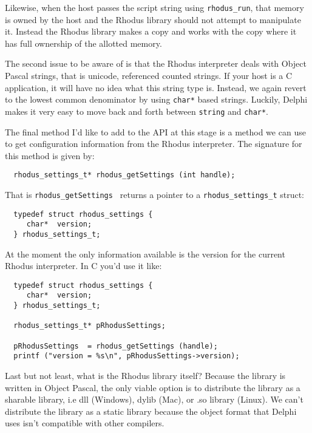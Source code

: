 Likewise, when the host passes the script string using {\tt rhodus_run}, that memory is owned by the host and the Rhodus library should not attempt to manipulate it. Instead the Rhodus library makes a copy and works with the copy where it has full ownership of the allotted memory.

The second issue to be aware of is that the Rhodus interpreter deals with Object Pascal strings, that is unicode, referenced counted strings. If your host is a C application, it will have no idea what this string type is. Instead, we again revert to the lowest common denominator by using {\tt char*} based strings. Luckily, Delphi makes it very easy to move back and forth between {\tt string} and {\tt char*}.

The final method I'd like to add to the API at this stage is a method we can use to get configuration information from the Rhodus interpreter. The signature for this method is given by:

\begin{lstlisting}
  rhodus_settings_t* rhodus_getSettings (int handle);
\end{lstlisting}

That is {\tt rhodus_getSettings } returns a pointer to a {\tt rhodus_settings_t} struct:

\begin{lstlisting}
  typedef struct rhodus_settings {
     char*  version;
  } rhodus_settings_t;
\end{lstlisting}

At the moment the only information available is the version for the current Rhodus interpreter. In C you'd use it like:

\begin{lstlisting}
  typedef struct rhodus_settings {
     char*  version;
  } rhodus_settings_t;

  rhodus_settings_t* pRhodusSettings;

  pRhodusSettings  = rhodus_getSettings (handle);
  printf ("version = %s\n", pRhodusSettings->version);
\end{lstlisting}

Last but not least, what is the Rhodus library itself?  Because the library is written in Object Pascal, the only viable option is to distribute the library as a sharable library, i.e dll (Windows), dylib (Mac), or .so library (Linux). We can't distribute the library as a static library because the object format that Delphi uses isn't compatible with other compilers.

